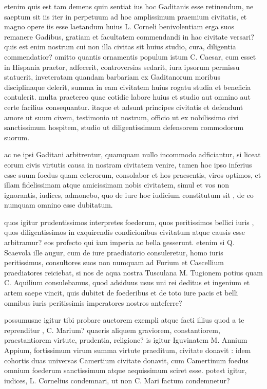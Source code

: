  etenim quis est tam demens quin sentiat ius hoc Gaditanis esse retinendum, ne saeptum sit iis iter in perpetuum ad hoc amplissimum praemium civitatis, et magno opere iis esse laetandum huius L. Corneli benivolentiam erga suos remanere Gadibus, gratiam et facultatem commendandi in hac civitate versari? quis est enim nostrum cui non illa civitas sit huius studio, cura, diligentia commendatior? omitto quantis ornamentis populum istum C. Caesar, cum esset in Hispania praetor, adfecerit, controversias sedarit, iura ipsorum permissu statuerit, inveteratam quandam barbariam ex Gaditanorum moribus disciplinaque delerit, summa in eam civitatem huius rogatu studia et beneficia contulerit. multa praetereo quae cotidie labore huius et studio aut omnino aut certe facilius consequantur. itaque et adsunt principes civitatis et defendunt amore ut suum civem, testimonio ut nostrum, officio ut ex nobilissimo civi sanctissimum hospitem, studio ut diligentissimum defensorem commodorum suorum.

 ac ne ipsi Gaditani arbitrentur, quamquam nullo incommodo adficiantur, si liceat eorum civis virtutis causa in nostram civitatem venire, tamen hoc ipso inferius esse suum foedus quam ceterorum, consolabor et hos praesentis, viros optimos, et illam fidelissimam atque amicissimam nobis civitatem, simul et vos non ignorantis, iudices, admonebo, quo de iure hoc iudicium constitutum sit , de eo numquam omnino esse dubitatum.

 quos igitur prudentissimos interpretes foederum, quos peritissimos bellici iuris , quos diligentissimos in exquirendis condicionibus civitatum atque causis esse arbitramur? eos profecto qui iam imperia ac bella gesserunt. etenim si Q. Scaevola ille augur, cum de iure praediatorio consuleretur, homo iuris peritissimus, consultores suos non numquam ad Furium et Cascellium praediatores reiciebat, si nos de aqua nostra Tusculana M. Tugionem potius quam C. Aquilium consulebamus, quod adsiduus usus uni rei deditus et ingenium et artem saepe vincit, quis dubitet de foederibus et de toto iure pacis et belli omnibus iuris peritissimis imperatores nostros anteferre?

 possumusne igitur tibi probare auctorem exempli atque facti illius quod a te reprenditur , C. Marium? quaeris aliquem graviorem, constantiorem, praestantiorem virtute, prudentia, religione? is igitur Iguvinatem M. Annium Appium, fortissimum virum summa virtute praeditum, civitate donavit : idem cohortis duas universas Camertium civitate donavit, cum Camertinum foedus omnium foederum sanctissimum atque aequissimum sciret esse. potest igitur, iudices, L. Cornelius condemnari, ut non C. Mari factum condemnetur?

